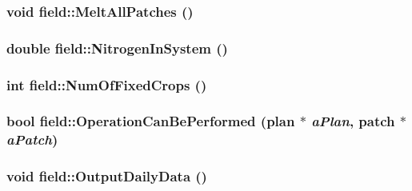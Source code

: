 \label{classfield_a4d3c3f8c50e61befbbda998cc4a7437d}
\hypertarget{classfield_aa848ac8ed702a8c82aea5263bb65e451}{
\subsubsection[{MeltAllPatches}]{\setlength{\rightskip}{0pt plus 5cm}void field::MeltAllPatches ()}}
\label{classfield_aa848ac8ed702a8c82aea5263bb65e451}
\hypertarget{classfield_ab9b2bfaedcd8a6421f4533160c6b4a80}{
\subsubsection[{NitrogenInSystem}]{\setlength{\rightskip}{0pt plus 5cm}double field::NitrogenInSystem ()}}
\label{classfield_ab9b2bfaedcd8a6421f4533160c6b4a80}
\hypertarget{classfield_ae82d54518055938a17684f162e98d5c8}{
\subsubsection[{NumOfFixedCrops}]{\setlength{\rightskip}{0pt plus 5cm}int field::NumOfFixedCrops ()}}
\label{classfield_ae82d54518055938a17684f162e98d5c8}
\hypertarget{classfield_a7ee560523f2f9f9f12ede3c2fba4b064}{
\subsubsection[{OperationCanBePerformed}]{\setlength{\rightskip}{0pt plus 5cm}bool field::OperationCanBePerformed ({\bf plan} $\ast$ {\em aPlan}, \/  {\bf patch} $\ast$ {\em aPatch})}}
\label{classfield_a7ee560523f2f9f9f12ede3c2fba4b064}
\hypertarget{classfield_a82c55e295edd95a5de179d29cb77b231}{
\subsubsection[{OutputDailyData}]{\setlength{\rightskip}{0pt plus 5cm}void field::OutputDailyData ()}}

